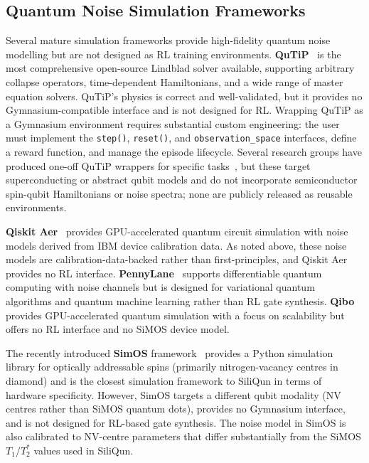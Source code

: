 \subsection{Quantum Noise Simulation Frameworks}
\label{sec:rw_noise_frameworks}

Several mature simulation frameworks provide high-fidelity quantum noise
modelling but are not designed as RL training environments.
\textbf{QuTiP}~\cite{Johansson2012,Johansson2013} is the most comprehensive open-source
Lindblad solver available, supporting arbitrary collapse operators,
time-dependent Hamiltonians, and a wide range of master equation solvers.
QuTiP's physics is correct and well-validated, but it provides no
Gymnasium-compatible interface and is not designed for RL. Wrapping QuTiP
as a Gymnasium environment requires substantial custom engineering: the
user must implement the \texttt{step()}, \texttt{reset()}, and
\texttt{observation\_space} interfaces, define a reward function, and
manage the episode lifecycle. Several research groups have produced
one-off QuTiP wrappers for specific tasks~\cite{Moro2021,Niu2019}, but
these target superconducting or abstract qubit models and do not incorporate
semiconductor spin-qubit Hamiltonians or noise spectra; none are publicly
released as reusable environments.

\textbf{Qiskit Aer}~\cite{Qiskit2024} provides GPU-accelerated quantum
circuit simulation with noise models derived from IBM device calibration
data. As noted above, these noise models are calibration-data-backed rather
than first-principles, and Qiskit Aer provides no RL interface.
\textbf{PennyLane}~\cite{Bergholm2018} supports differentiable quantum
computing with noise channels but is designed for variational quantum
algorithms and quantum machine learning rather than RL gate synthesis.
\textbf{Qibo}~\cite{Efthymiou2021} provides GPU-accelerated quantum
simulation with a focus on scalability but offers no RL interface and no
SiMOS device model.

The recently introduced \textbf{SimOS} framework~\cite{SimOS2025} provides
a Python simulation library for optically addressable spins (primarily
nitrogen-vacancy centres in diamond) and is the closest simulation
framework to SiliQun in terms of hardware specificity. However, SimOS
targets a different qubit modality (NV centres rather than SiMOS quantum
dots), provides no Gymnasium interface, and is not designed for RL-based
gate synthesis. The noise model in SimOS is also calibrated to NV-centre
parameters that differ substantially from the SiMOS $T_1$/$T_2^*$
values used in SiliQun.

